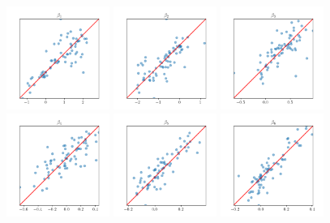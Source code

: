 \begin{figure}
    \centering
    \includegraphics[width=0.3\textwidth]{files/predictions_beta/beta_1.png}
    \includegraphics[width=0.3\textwidth]{files/predictions_beta/beta_2.png}
    \includegraphics[width=0.3\textwidth]{files/predictions_beta/beta_3.png}
    \includegraphics[width=0.3\textwidth]{files/predictions_beta/beta_4.png}
    \includegraphics[width=0.3\textwidth]{files/predictions_beta/beta_5.png}
    \includegraphics[width=0.3\textwidth]{files/predictions_beta/beta_6.png}

\end{figure}
